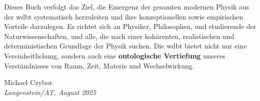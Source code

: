 \documentclass[11pt, a5paper, twoside, openright]{book}
\begin{document}
Dieses Buch verfolgt das Ziel, die Emergenz der gesamten modernen Physik aus der \gls{wdbt} systematisch herzuleiten und ihre konzeptionellen sowie empirischen Vorteile darzulegen. Es richtet sich an
Physiker, Philosophen, und studierende der Naturwissenschaften, und alle, die nach einer kohärenten, realistischen und deterministischen Grundlage der Physik suchen. Die \gls{wdbt} bietet nicht nur eine Vereinheitlichung,
sondern auch eine \textbf{ontologische Vertiefung} unseres Verständnisses von Raum, Zeit, Materie und Wechselwirkung.

\begin{flushright}
    Michael Czybor \\
    \emph{Langenstein/AT, August 2025}
\end{flushright}

\tableofcontents
\listoffigures
\listoftables

\mainmatter






\appendix


\backmatter
\printbibliography[title=Literaturverzeichnis]
\glswritefiles
\printglossary[title=Glossar]
\printglossary[type=acronym, title=Abkürzungen]
\end{document}
